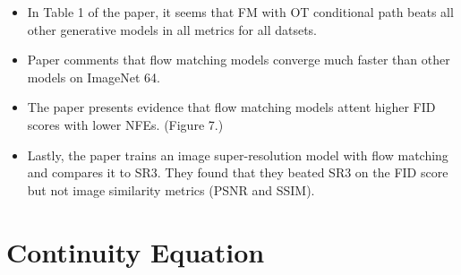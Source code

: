 \documentclass[10pt]{article}
\begin{document}
\begin{itemize}
  \item In Table 1 of the paper, it seems that FM with OT conditional path beats all other generative models in all metrics for all datsets.
  
  \item Paper comments that flow matching models converge much faster than other models on ImageNet 64.
  
  \item The paper presents evidence that flow matching models attent higher FID scores with lower NFEs. (Figure 7.)
  
  \item Lastly, the paper trains an image super-resolution model with flow matching and compares it to SR3. They found that they beated SR3 on the FID score but not image similarity metrics (PSNR and SSIM).
\end{itemize}

\appendix

\section{Continuity Equation}
\end{document}
